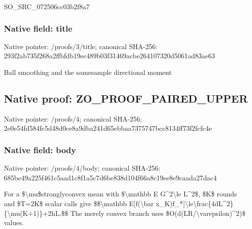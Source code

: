 \documentclass[10pt,a4paper]{article}
\begin{document}
SO\_SRC\_072506cc03b2f8a7


\subsubsection{Native field: title}


Native pointer: /proofs/3/title; canonical SHA-256: 293f2ab735f268a2ffbfdb19\allowbreak{}ec489b03f31469acbe264107\allowbreak{}320d5061ad83ae63


Ball smoothing and the samesample directional moment


\subsection{Native proof: ZO\_PROOF\_PAIRED\_UPPER}


Native pointer: /proofs/4; canonical SHA-256: 2e0e54fd584fc5d48d0ce8a9\allowbreak{}dba241d65ebbaa7375747bcc\allowbreak{}8134ff73f2fcfc4e



\subsubsection{Native field: body}


Native pointer: /proofs/4/body; canonical SHA-256: 685be49a225f461c5aad1c8f\allowbreak{}1a5c7d6be838d104f66a8c19\allowbreak{}ee8e9caada27dac4


For a \$\textbackslash{}mu\$stronglyconvex mean with \$\textbackslash{}mathbb E G\textasciicircum{}2\textbackslash{}le L\textasciicircum{}2\$, \$K\$ rounds and \$T=2K\$ scalar calls give
\$\$\textbackslash{}mathbb E[f(\textbackslash{}bar x\_K)f\_*]\textbackslash{}le\textbackslash{}frac\{4dL\textasciicircum{}2\}\allowbreak{}\{\textbackslash{}mu(K+1)\}+2hL.\$\$
The merely convex branch uses \$O(d(LR/\textbackslash{}varepsilon)\textasciicircum{}2)\$ values.
\end{document}
